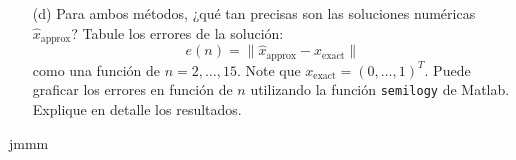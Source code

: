 \begin{enumerate}
    \item[(d)] Para ambos métodos, ¿qué tan precisas son las soluciones numéricas $\hat{x}_{\text{approx}}$? Tabule los errores de la solución:
    \[
    e(n) = \|\hat{x}_{\text{approx}} - x_{\text{exact}}\|
    \]
    como una función de $n = 2, \ldots, 15$. Note que $x_{\text{exact}} = (0, \ldots, 1)^T$. Puede graficar los errores en función de $n$ utilizando la función \texttt{semilogy} de Matlab. Explique en detalle los resultados.
\end{enumerate}

jmmm